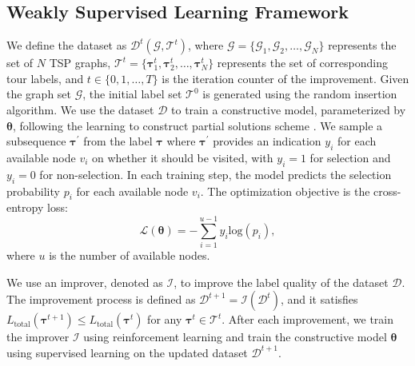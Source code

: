 \subsection{Weakly Supervised Learning Framework}
We define the dataset as $\mathcal{D}^t(\boldsymbol{\mathcal{G}}, \boldsymbol{\mathcal{T}}^t)$, where $\boldsymbol{\mathcal{G}}=\{\mathcal{G}_1,\mathcal{G}_2,\dots,\mathcal{G}_N\}$ represents the set of $N$ TSP graphs, $\boldsymbol{\mathcal{T}}^t = \{ \boldsymbol{\tau}_1^t, \boldsymbol{\tau}_2^t, \dots, \boldsymbol{\tau}_N^t\}$ represents the set of corresponding tour labels, and $t \in \{0,1,\dots,T\}$ is the iteration counter of the improvement.
Given the graph set $\boldsymbol{\mathcal{G}}$, the initial label set $\boldsymbol{\mathcal{T}}^0$ is generated using the random insertion algorithm.
We use the dataset $\mathcal{D}$ to train a constructive model, parameterized by $\boldsymbol{\theta}$, 
following the learning to construct partial solutions scheme \cite{luo2023neural}.
We sample a subsequence $\boldsymbol{\tau}^{\prime}$ from the label $\boldsymbol{\tau}$ where $\boldsymbol{\tau}^{\prime}$ provides an indication $y_i$ for each available node $v_i$ on whether it should be visited, with $y_i=1$ for selection and $y_i=0$ for non-selection. 
In each training step, the model predicts the selection probability $p_i$ for each available node $v_i$. 
The optimization objective is the cross-entropy loss:
\begin{equation}
{\mathcal{L}(\boldsymbol{\theta})=-\sum\limits_{i=1}^{u-1}{y_i\text{log}(p_i)}},
\label{eq:Balance}
\end{equation}
where $u$ is the number of available nodes. 

We use an improver, denoted as $\mathcal{I}$, to improve the label quality of the dataset $\mathcal{D}$. 
The improvement process is defined as $\mathcal{D}^{t+1} = \mathcal{I}(\mathcal{D}^t)$, and it satisfies $L_{\text{total}}(\boldsymbol{\tau}^{t+1}) \leq L_{\text{total}}(\boldsymbol{\tau}^{t})$ for any $\boldsymbol{\tau}^{t} \in \boldsymbol{\mathcal{T}}^{t}$. 
After each improvement, we train the improver $\mathcal{I}$ using reinforcement learning and train the constructive model $\boldsymbol{\theta}$ using supervised learning on the updated dataset $\mathcal{D}^{t+1}$. 

